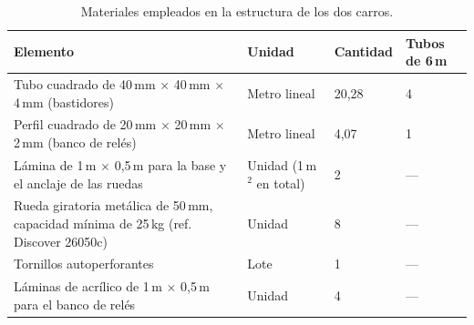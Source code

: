 \begin{table}[H]
\centering
\small
\caption{Materiales empleados en la estructura de los dos carros.}
\label{tab:materiales_estructura}
\begin{tabularx}{\textwidth}{YL{2.8cm}C{1.8cm}C{2.0cm}}
\toprule
\textbf{Elemento} & \textbf{Unidad} & \textbf{Cantidad} & \textbf{Tubos de 6\,m}\\
\midrule
Tubo cuadrado de 40\,mm $\times$ 40\,mm $\times$ 4\,mm (bastidores) & Metro lineal & 20,28 & 4\\
Perfil cuadrado de 20\,mm $\times$ 20\,mm $\times$ 2\,mm (banco de relés) & Metro lineal & 4,07 & 1\\
Lámina de 1\,m $\times$ 0,5\,m para la base y el anclaje de las ruedas & Unidad (1\,m$^2$ en total) & 2 & ---\\
Rueda giratoria metálica de 50\,mm, capacidad mínima de 25\,kg (ref. Discover 26050c) & Unidad & 8 & ---\\
Tornillos autoperforantes & Lote & 1 & ---\\
Láminas de acrílico de 1\,m $\times$ 0,5\,m para el banco de relés & Unidad & 4 & ---\\
\bottomrule
\end{tabularx}
\end{table}